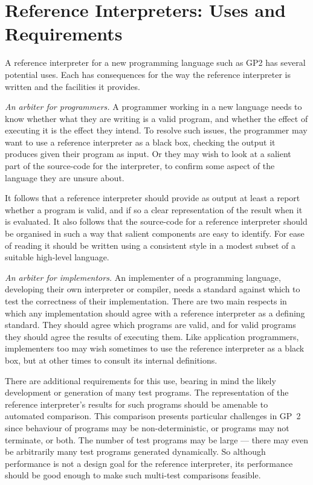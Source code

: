 \section{Reference Interpreters: Uses and Requirements}
\label{sec:usesrequirements}

A reference interpreter for a new programming language such as GP2
has several potential uses.
Each has consequences for the
way the reference interpreter is written and the
facilities it provides.

\vspace{.5\baselineskip}
\noindent
\emph{An arbiter for programmers.}
A programmer working in a new language needs to
know whether what they are writing is a valid
program, and whether the effect of executing it
is the effect they intend.
To resolve such issues, the programmer may want to
use a reference interpreter as a black box,
checking the output it produces given their
program as input.
Or they may wish to look at a salient part of the
source-code for the interpreter, to confirm some
aspect of the language they are unsure about.

It follows that a reference interpreter should
provide as output at least a report whether a
program is valid, and if so a clear representation
of the result when it is evaluated.
It also follows that the source-code for a
reference interpreter should
be organised in such a way that salient components
are easy to identify.
For ease of reading it should be written using a
consistent style in a modest subset of a suitable
high-level language.

\vspace{.5\baselineskip}
\noindent
\emph{An arbiter for implementors.}
An implementer of a programming language,
developing their own interpreter or compiler,
needs a standard against which to test the correctness
of their implementation.
There are two main respects in which any
implementation should agree with a reference interpreter
as a defining standard.
They should agree which programs are valid,
and for valid programs they should agree the results
of executing them.
Like application programmers, implementers too may
wish sometimes to use the reference interpreter as
a black box, but at other times to consult its
internal definitions. 

There are additional requirements for this use,
bearing in mind the likely development or generation
of many test programs.
The representation of the
reference interpreter's results for such programs
should be amenable to automated comparison.
This comparison presents particular challenges in GP~2 since
behaviour of programs may be non-deterministic,
or programs may not terminate, or both.
The number of test programs may be large
--- there may even be arbitrarily many test programs generated dynamically.
So although performance is not a design goal for the reference
interpreter, its performance should be good enough to
make such multi-test comparisons feasible.

